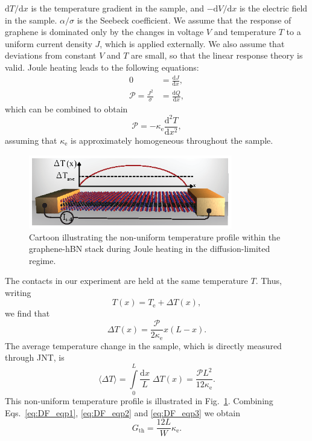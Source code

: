  $\mathrm{d}T/\mathrm{d}x$ is the temperature gradient in the sample,  and $-\mathrm{d}V/\mathrm{d}x$ is the electric field in the sample.  $\alpha/\sigma$ is the Seebeck coefficient.  We assume that the response of graphene is dominated only by the changes in voltage $V$ and temperature $T$ to a uniform current density $J$, which is applied externally.  We also assume that deviations from constant $V$ and $T$ are small, so that the linear response theory is valid.  Joule heating leads to the following equations: \begin{subequations}\begin{align}
0 &= \frac{\mathrm{d}J}{\mathrm{d}x}, \\
\mathcal{P} = \frac{J^2}{\sigma} &=  \frac{\mathrm{d}Q}{\mathrm{d}x},
\end{align}\end{subequations}which can be combined to obtain \begin{equation}
\mathcal{P} = -\kappa_{\mathrm{e}} \frac{\mathrm{d}^2 T}{\mathrm{d}x^2},
\end{equation}
assuming that $\kappa_{\mathrm{e}}$ is approximately homogeneous throughout the sample.  


 \begin{figure}
\includegraphics[width=3.5in]{figures/Dirac_fluid/S7.eps}
\caption{Cartoon illustrating the non-uniform temperature profile within the graphene-hBN stack during Joule heating in the diffusion-limited regime.}
\label{fig:DF_S7}
\end{figure}

The contacts in our experiment are held at the same temperature $T$.   Thus, writing \begin{equation}
T(x) = T_{\mathrm{e}} + \Delta T(x),
\end{equation}we find that \begin{equation}
\Delta T(x) = \frac{\mathcal{P}}{2\kappa_{\mathrm{e}}}x(L-x).  
\end{equation}
The average temperature change in the sample, which is directly measured through JNT, is \begin{equation}
\langle \Delta T\rangle = \int\limits_0^L \frac{\mathrm{d}x}{L}\; \Delta T(x)  = \frac{\mathcal{P}L^2}{12\kappa_{\mathrm{e}}}.  \label{eq:DF_eqp3}
\end{equation}
This non-uniform temperature profile is illustrated in Fig.~\ref{fig:DF_S7}.   Combining Eqs.~\ref{eq:DF_eqp1}, \ref{eq:DF_eqp2} and \ref{eq:DF_eqp3} we obtain \begin{equation}
G_{\mathrm{th}} = \frac{12L}{W} \kappa_{\mathrm{e}}.
\end{equation}

